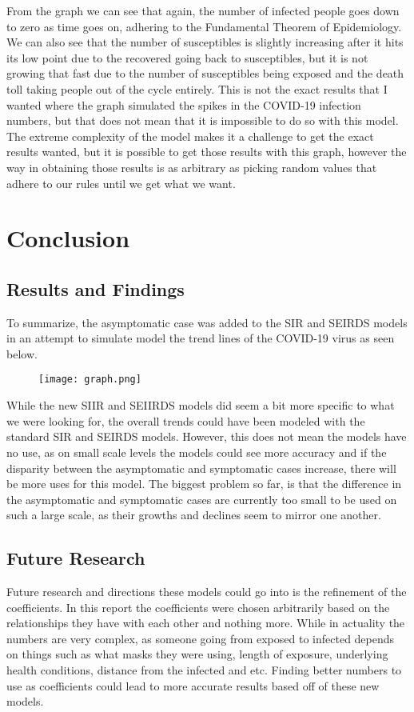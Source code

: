 \documentclass[12pt]{article} %
\begin{document}
From the graph we can see that again, the number of infected people goes down to zero as time goes on, adhering to the Fundamental Theorem of Epidemiology. We can also see that the number of susceptibles is slightly increasing after it hits its low point due to the recovered going back to susceptibles, but it is not growing that fast due to the number of susceptibles being exposed and the death toll taking people out of the cycle entirely. This is not the exact results that I wanted where the graph simulated the spikes in the COVID-19 infection numbers, but that does not mean that it is impossible to do so with this model. The extreme complexity of the model makes it a challenge to get the exact results wanted, but it is possible to get those results with this graph, however the way in obtaining those results is as arbitrary as picking random values that adhere to our rules until we get what we want. 

\section{Conclusion}
\subsection{Results and Findings}
To summarize, the asymptomatic case was added to the SIR and SEIRDS models in an attempt to simulate model the trend lines of the COVID-19 virus as seen below. 
\begin{figure}[h!]
\centering
\texttt{[image: graph.png]}
\end{figure}
\pagebreak
While the new SIIR and SEIIRDS models did seem a bit more specific to what we were looking for, the overall trends could have been modeled with the standard SIR and SEIRDS models. However, this does not mean the models have no use, as on small scale levels the models could see more accuracy and if the disparity between the asymptomatic and symptomatic cases increase, there will be more uses for this model. The biggest problem so far, is that the difference in the asymptomatic and symptomatic cases are currently too small to be used on such a large scale, as their growths and declines seem to mirror one another. 
\subsection{Future Research}
Future research and directions these models could go into is the refinement of the coefficients. In this report the coefficients were chosen arbitrarily based on the relationships they have with each other and nothing more. While in actuality the numbers are very complex, as someone going from exposed to infected depends on things such as what masks they were using, length of exposure, underlying health conditions, distance from the infected and etc. Finding better numbers to use as coefficients could lead to more accurate results based off of these new models.
\end{document}
